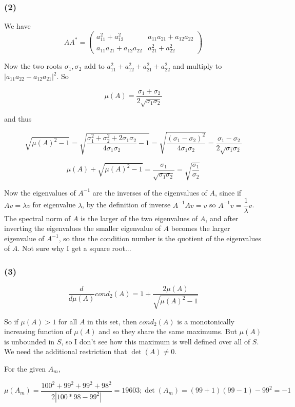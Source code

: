 \documentclass{article}
\begin{document}
\subsubsection{(2)}
We have 
\[AA^* = \left(\begin{array}{cc} a_{11}^2 + a_{12}^2 & a_{11} a_{21} + a_{12} a_{22} \\ a_{11} a_{21} + a_{12} a_{22} & a_{21}^2 + a_{22}^2 \end{array}\right) \]

Now the two roots $\sigma_1, \sigma_2$ add to $a_{11}^2 + a_{12}^2 + a_{21}^2 + a_{22}^2$ and multiply to $|a_{11} a_{22} - a_{12} a_{21}|^2$.  So 

\[ \mu(A) = \dfrac{\sigma_1 + \sigma_2}{2\sqrt{\sigma_1 \sigma_2}} \]

and thus

\[ \sqrt{\mu(A)^2 - 1} = \sqrt{\dfrac{\sigma_1^2 + \sigma_2^2 + 2\sigma_1 \sigma_2}{4 \sigma_1 \sigma_2} - 1} = \sqrt{\dfrac{(\sigma_1 - \sigma_2)^2}{4 \sigma_1 \sigma_2}} = \dfrac{\sigma_1 - \sigma_2}{2\sqrt{\sigma_1 \sigma_2}}\]

\[ \mu(A) + \sqrt{\mu(A)^2 - 1} = \dfrac{\sigma_1}{\sqrt{\sigma_1 \sigma_2}} = \sqrt{\dfrac{\sigma_1}{\sigma_2}} \]

Now the eigenvalues of $A^{-1}$ are the inverses of the eigenvalues of $A$, since if $Av = \lambda v$ for eigenvalue $\lambda$, by the definition of inverse $A^{-1} A v = v$ so $A^{-1} v = \dfrac{1}{\lambda} v$. The spectral norm of $A$ is the larger of the two eigenvalues of $A$, and after inverting the eigenvalues the smaller eigenvalue of $A$ becomes the larger eigenvalue of $A^{-1}$, so thus the condition number is the quotient of the eigenvalues of $A$. Not sure why I get a square root...

\subsubsection{(3)}

\[ \dfrac{d}{d\mu(A)} cond_2(A) = 1 + \dfrac{2 \mu(A)}{\sqrt{\mu(A)^2 - 1}} \]

So if $\mu(A) > 1$ for all $A$ in this set, then $cond_2(A)$ is a monotonically increasing function of $\mu(A)$ and so they share the same maximums. But $\mu(A)$ is unbounded in $S$, so I don't see how this maximum is well defined over all of $S$. We need the additional restriction that $\det(A) \neq 0$. 

For the given $A_m$, 

\[ \mu(A_m) = \dfrac{100^2 + 99^2 + 99^2 + 98^2}{2|100*98 - 99^2|} = 19603; \det(A_m) = (99+1)(99-1) - 99^2 = -1 \]
\end{document}
